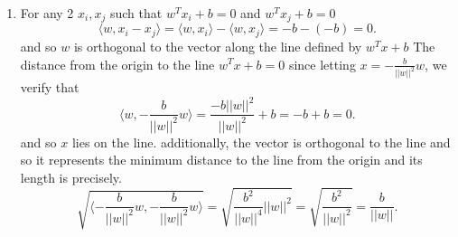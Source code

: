 \documentclass[11pt]{article}
\begin{document}
{\begin{enumerate}
\[    .\] 
    \[
        = \sum_{j=1}^{d}x_j\sum_{i=1}^{d}x_ia_{ij} = \sum_{j=1}^{d}\sum_{i=1}^{d}x_ix_ja_{ij} = f
    .\] 
    \[
        \frac{df}{dx_i} = 2x_ia_{ii} + 2\sum_{j=1; j \ne i}^{d}x_ja_{ij} = 2\sum_{j=1}^{d}x_ja_{ji} = 2x^{T}A_{i}
    .\] 
    Additionally
    \[
        2\sum_{j=1}^{d}x_ja_{ji} = 2\sum_{j=1}^{d}a_{ij}x_j = 2(Ax)_i \implies \frac{df}{dx} = 2Ax
    .\] 
    then
    \[
        \frac{df}{dx_i} = 2x^{T}A_i = 2(\sum_{j=1}^{d}x_jA_{ji}) \implies \frac{d^2f}{dx_idx_j} = 2A_{ji} = 2A_{ij}
    .\] 
\item For any 2 $x_i,x_j$ such that $w^{T}x_i + b = 0$ and $w^{T}x_j + b = 0$
     \[
    \langle w, x_i - x_j \rangle = \langle w, x_i \rangle - \langle w, x_j \rangle = -b - (-b) = 0
    .\] 
    and so $w$ is orthogonal to the vector along the line defined by $w^{T}x + b$
    The distance from the origin to the line $w^{T}x + b = 0$ since letting $x = -\frac{b}{||w||^2}w$, we verify that
    \[
    \langle w, -\frac{b}{||w||^2}w \rangle = \frac{-b ||w||^2}{||w||^2} + b = -b + b = 0
    .\] 
    and so $x$ lies on the line. additionally, the vector is orthogonal to the line and so it represents the minimum distance to the line from the origin and its length is precisely.
    \[
    \sqrt{\langle -\frac{b}{||w||^2}w , -\frac{b}{||w||^2}w \rangle} = \sqrt{\frac{b^2}{||w||^{4}}||w||^{2}} = \sqrt{\frac{b^2}{||w||^2}} = \frac{b}{||w||}
    .\] 
    \end{enumerate}
}
\end{document}
